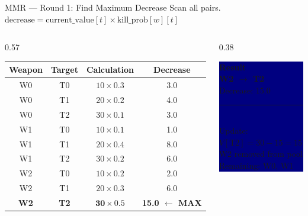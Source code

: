 \documentclass[aspectratio=169,10pt]{beamer}
\begin{document}
\begin{frame}{MMR --- Round 1: Find Maximum Decrease}
  {\small Scan all pairs.\quad
    $\text{decrease} = \text{current\_value}[t]
      \times \text{kill\_prob}[w][t]$}

  \begin{columns}[T]
    \begin{column}{0.57\textwidth}
      \vspace{4pt}
      \begin{tabular}{cccc}
        \toprule
        \rowcolor{navy}
          \color{white}\bfseries Weapon &
          \color{white}\bfseries Target &
          \color{white}\bfseries Calculation &
          \color{white}\bfseries Decrease \\
        \midrule
        W0 & T0 & $10\times0.3$ & 3.0 \\
        W0 & T1 & $20\times0.2$ & 4.0 \\
        W0 & T2 & $30\times0.1$ & 3.0 \\
        W1 & T0 & $10\times0.1$ & 1.0 \\
        W1 & T1 & $20\times0.4$ & 8.0 \\
        W1 & T2 & $30\times0.2$ & 6.0 \\
        W2 & T0 & $10\times0.2$ & 2.0 \\
        W2 & T1 & $20\times0.3$ & 6.0 \\
        \rowcolor{lightyellow}
        \bfseries W2 & \bfseries T2 &
          $\mathbf{30\times0.5}$ &
          \cellcolor{amber}\color{white}\bfseries 15.0 $\leftarrow$ MAX \\
        \bottomrule
      \end{tabular}
    \end{column}

    \begin{column}{0.38\textwidth}
      \colorbox{navy}{\begin{minipage}{\linewidth}
        \vspace{0.2cm}\centering
        {\color{teal}\bfseries Result}\\[0.2cm]
        {\color{white}\Large\bfseries W2 $\rightarrow$ T2}\\[0.15cm]
        {\color{amber} Decrease: 15.0}\\[0.2cm]
        {\color{teal}\rule{3cm}{0.3pt}}\\[0.15cm]
        {\color{mygray}\small Update:}\\
        {\color{teallt}\small $V[\text{T2}] = 30 - 15 = 15$}\\[0.1cm]
        {\color{mygray}\small W2 removed from pool}\\[0.1cm]
        {\color{teallt}\small Remaining: W0, W1}
        \vspace{0.2cm}
      \end{minipage}}
    \end{column}
  \end{columns}
\end{frame}
\end{document}
